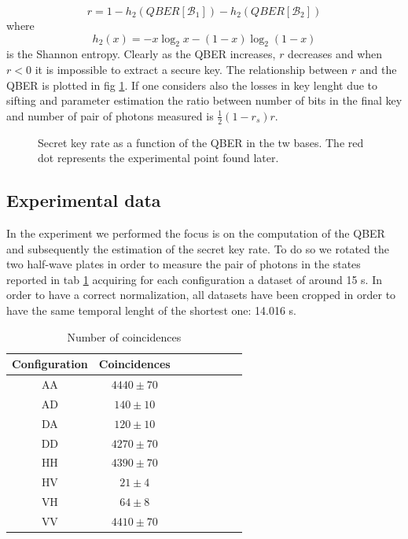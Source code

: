 \documentclass[a4paper, 11pt]{article}
\begin{document}
\begin{enumerate}
      \begin{equation*}
        r = 1 - h_2(QBER[\mathcal{B}_1]) - h_2(QBER[\mathcal{B}_2])
      \end{equation*}
      where
      \begin{equation*}
        h_2(x) = -x\log_2x - (1 - x)\log_2(1 - x)
      \end{equation*}
      is the Shannon entropy.
      Clearly as the QBER increases, $r$ decreases and when $r < 0$ it is impossible to extract a secure key. The relationship between $r$ and the QBER is plotted in fig \ref{fig:r_vs_qber}.
      If one considers also the losses in key lenght due to sifting and parameter estimation the ratio between number of bits in the final key and number of pair of photons measured is $\frac{1}{2} (1 - r_s) r$.
    \end{enumerate}

    \begin{figure}[H]
      \centering
      \caption{Secret key rate as a function of the QBER in the tw bases. The red dot represents the experimental point found later.}
      \label{fig:r_vs_qber}
    \end{figure}

    \subsection{Experimental data}
      In the experiment we performed the focus is on the computation of the QBER and subsequently the estimation of the secret key rate. To do so we rotated the two half-wave plates in order to measure the pair of photons in the states reported in tab \ref{tab:QKD_coinc} acquiring for each configuration a dataset of around 15 s. In order to have a correct normalization, all datasets have been cropped in order to have the same temporal lenght of the shortest one: 14.016 s.

      \begin{table}[H]
        \centering
        \begin{tabular}{cccccccc}
          \toprule
          Configuration & Coincidences \\
          \midrule
          AA & $4440 \pm 70$ \\
          AD & $140 \pm 10$ \\
          DA & $120 \pm 10$ \\
          DD & $4270 \pm 70$ \\
          \midrule
          HH & $4390 \pm 70$ \\
          HV & $21 \pm 4$ \\
          VH & $64 \pm 8$ \\
          VV & $4410 \pm 70$ \\
          \bottomrule
        \end{tabular}
        \caption{Number of coincidences}
        \label{tab:QKD_coinc}
      \end{table}
\end{document}
